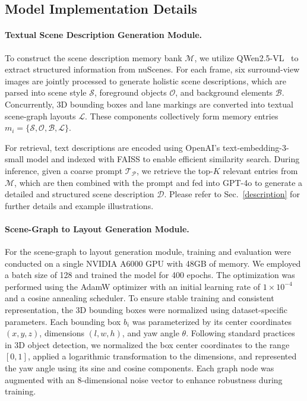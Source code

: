 \subsection{Model Implementation Details}
\paragraph{Textual Scene Description Generation Module.}
To construct the scene description memory bank $\mathcal{M}$, we utilize QWen2.5-VL~\cite{Qwen2.5-VL} to extract structured information from nuScenes. For each frame, six surround-view images are jointly processed to generate holistic scene descriptions, which are parsed into scene style $\mathcal{S}$, foreground objects $\mathcal{O}$, and background elements $\mathcal{B}$. Concurrently, 3D bounding boxes and lane markings are converted into textual scene-graph layouts $\mathcal{L}$. These components collectively form memory entries $m_i = \{\mathcal{S}, \mathcal{O}, \mathcal{B}, \mathcal{L}\}$.

For retrieval, text descriptions are encoded using OpenAI’s text-embedding-3-small model and indexed with FAISS to enable efficient similarity search. During inference, given a coarse prompt $\mathcal{T}_\mathcal{P}$, we retrieve the top-$K$ relevant entries from $\mathcal{M}$, which are then combined with the prompt and fed into GPT-4o to generate a detailed and structured scene description $\mathcal{D}$.
Please refer to Sec.~\ref{description} for further details and example illustrations.

\paragraph{Scene-Graph to Layout Generation Module.}
For the scene-graph to layout generation module, training and evaluation were conducted on a single NVIDIA A6000 GPU with 48GB of memory. We employed a batch size of 128 and trained the model for 400 epochs. The optimization was performed using the AdamW optimizer with an initial learning rate of $1 \times 10^{-4}$ and a cosine annealing scheduler. To ensure stable training and consistent representation, the 3D bounding boxes were normalized using dataset-specific parameters. Each bounding box $b_i$ was parameterized by its center coordinates $(x, y, z)$, dimensions $(l, w, h)$, and yaw angle $\theta$. Following standard practices in 3D object detection, we normalized the box center coordinates to the range $[0, 1]$, applied a logarithmic transformation to the dimensions, and represented the yaw angle using its sine and cosine components. Each graph node was augmented with an 8-dimensional noise vector to enhance robustness during training.

